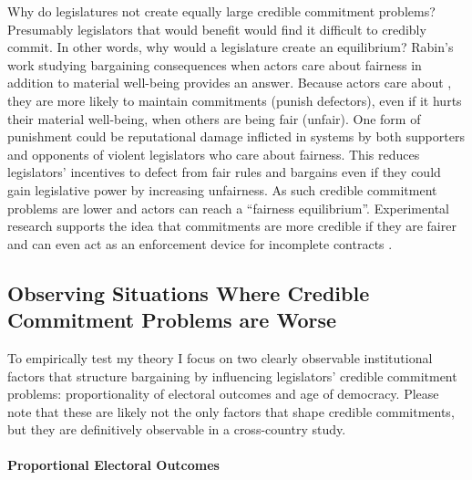 \documentclass[a4paper]{article}\usepackage[]{graphicx}\usepackage[]{color}
\begin{document}
Why do  legislatures  not create equally large credible commitment problems? Presumably legislators that would benefit  would find it difficult to credibly commit. In other words, why would a  legislature  create an equilibrium? Rabin's \citeyearpar{Rabin1993} work studying bargaining consequences when actors care about fairness in addition to material well-being provides an answer. Because actors care about , they are more likely to maintain commitments (punish defectors), even if it hurts their material well-being, when others are being fair (unfair). One form of punishment could be reputational damage inflicted in  systems by both supporters and opponents of violent legislators who care about fairness. This reduces legislators' incentives to defect from fair rules and bargains even if they could gain legislative power by increasing unfairness. As such credible commitment problems are lower and actors can reach a ``fairness equilibrium''. Experimental research supports the idea that commitments are more credible if they are fairer \citep{Ellingsen2004} and can even act as an enforcement device for incomplete contracts \citep[for a review]{Fehr2008}.


\subsection{Observing Situations Where Credible Commitment Problems are Worse}

To empirically test my theory I focus on two clearly observable institutional factors that structure bargaining by influencing legislators' credible commitment problems: proportionality of electoral outcomes and age of democracy. Please note that these are likely not the only factors that shape credible commitments, but they are definitively observable in a cross-country study.

\paragraph{Proportional Electoral Outcomes}
\end{document}
